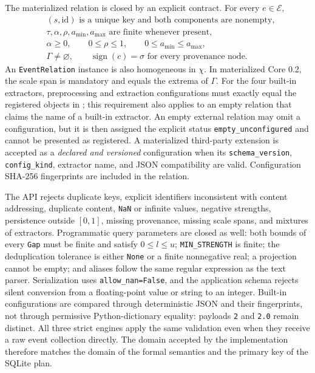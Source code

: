 \documentclass[11pt,a4paper]{article}
\newcommand{\Events}{\mathcal{E}}
\newcommand{\code}[1]{\texttt{#1}}
\begin{document}
The materialized relation is closed by an explicit contract. For every $e\in\Events$,
\begin{equation}
\begin{aligned}
 &(s,\mathrm{id})\text{ is a unique key and both components are nonempty},\\
 &\tau,\alpha,\rho,a_{\min},a_{\max}\text{ are finite whenever present},\\
 &\alpha\geq0,\qquad 0\leq\rho\leq1,\qquad 0\leq a_{\min}\leq a_{\max},\\
 &\Gamma\neq\varnothing,\qquad \operatorname{sign}(c)=\sigma\text{ for every provenance node}.
\end{aligned}
\end{equation}
An \code{EventRelation} instance is also homogeneous in $\chi$. In materialized Core 0.2, the scale span is mandatory and equals the extrema of $\Gamma$. For the four built-in extractors, preprocessing and extraction configurations must exactly equal the registered objects in ; this requirement also applies to an empty relation that claims the name of a built-in extractor. An empty external relation may omit a configuration, but it is then assigned the explicit status \code{empty\_unconfigured} and cannot be presented as registered. A materialized third-party extension is accepted as a \emph{declared and versioned} configuration when its \code{schema\_version}, \code{config\_kind}, extractor name, and JSON compatibility are valid. Configuration SHA-256 fingerprints are included in the relation.

The API rejects duplicate keys, explicit identifiers inconsistent with content addressing, duplicate content, \code{NaN} or infinite values, negative strengths, persistence outside $[0,1]$, missing provenance, missing scale spans, and mixtures of extractors. Programmatic query parameters are closed as well: both bounds of every \code{Gap} must be finite and satisfy $0\leq l\leq u$; \code{MIN\_STRENGTH} is finite; the deduplication tolerance is either \code{None} or a finite nonnegative real; a projection cannot be empty; and aliases follow the same regular expression as the text parser. Serialization uses \code{allow\_nan=False}, and the application schema rejects silent conversion from a floating-point value or string to an integer. Built-in configurations are compared through deterministic JSON and their fingerprints, not through permissive Python-dictionary equality: payloads \code{2} and \code{2.0} remain distinct. All three strict engines apply the same validation even when they receive a raw event collection directly. The domain accepted by the implementation therefore matches the domain of the formal semantics and the primary key of the SQLite plan.
\end{document}
